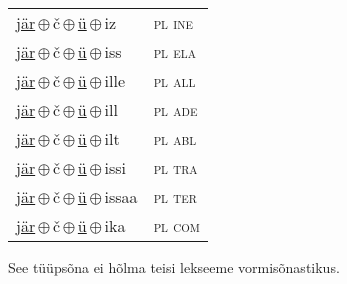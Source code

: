 \begin{minipage}{\textwidth}
\begin{sideways}
\begin{tabular}{l l}
\underline{jär}\,$\oplus$\,č\,$\oplus$\,\underline{ü}\,$\oplus$\,iz & \textsc{ pl ine } \\
\underline{jär}\,$\oplus$\,č\,$\oplus$\,\underline{ü}\,$\oplus$\,iss & \textsc{ pl ela } \\
\underline{jär}\,$\oplus$\,č\,$\oplus$\,\underline{ü}\,$\oplus$\,ille & \textsc{ pl all } \\
\underline{jär}\,$\oplus$\,č\,$\oplus$\,\underline{ü}\,$\oplus$\,ill & \textsc{ pl ade } \\
\underline{jär}\,$\oplus$\,č\,$\oplus$\,\underline{ü}\,$\oplus$\,ilt & \textsc{ pl abl } \\
\underline{jär}\,$\oplus$\,č\,$\oplus$\,\underline{ü}\,$\oplus$\,issi & \textsc{ pl tra } \\
\underline{jär}\,$\oplus$\,č\,$\oplus$\,\underline{ü}\,$\oplus$\,issaa & \textsc{ pl ter } \\
\underline{jär}\,$\oplus$\,č\,$\oplus$\,\underline{ü}\,$\oplus$\,ika & \textsc{ pl com } \\
\end{tabular}
\end{sideways}
\label{tab:tüüpsõnamall-järčü}

\end{minipage}

 
\vspace{1em}
\noindent See tüüpsõna ei hõlma teisi lekseeme vormi\-sõnastikus.
